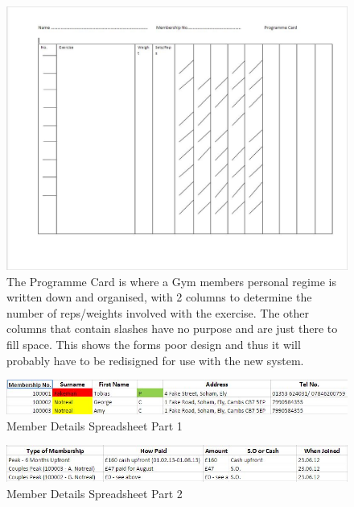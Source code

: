 \begin{figure}[H]
    \includegraphics[width=\textwidth]{Programmecard.JPG}
    \caption{The Programme Card is where a Gym members personal regime is written down and organised, with 2 columns to determine the number of reps/weights involved with the exercise. The other columns that contain slashes have no purpose and are just there to fill space. This shows the forms poor design and thus it will probably have to be redisigned for use with the new system.} \label{fig:Programme Card}
\end{figure}

\begin{figure}[H]
    \includegraphics[width=\textwidth]{MembershipSpreadsheet1.JPG}
    \caption{Member Details Spreadsheet Part 1} \label{fig:Member Details Spreadsheet Part 1}
\end{figure}

\begin{figure}[H]
    \includegraphics[width=\textwidth]{MembershipSpreadsheet2.JPG}
    \caption{Member Details Spreadsheet Part 2} \label{fig:Member Details Spreadsheet Part 2}
\end{figure}

